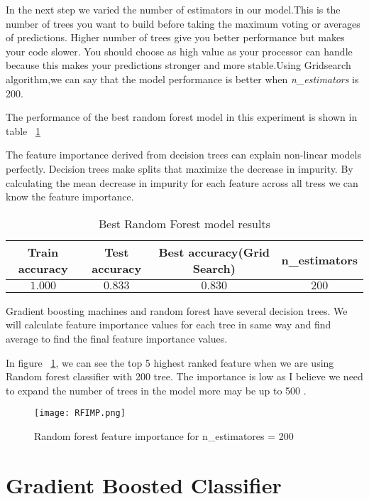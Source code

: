 \documentclass{article}
\begin{document}
In the next step we varied the number of estimators in our model.This is the number of trees you want to build before taking the maximum voting or averages of predictions. Higher number of trees give you better performance but makes your code slower. You should choose as high value as your processor can handle because this makes your predictions stronger and more stable.Using Gridsearch algorithm,we can say that the model performance is better when \textit{n\_estimators} is 200.

The performance of the best random forest model in this experiment is shown in table ~\ref{table:3}

The feature importance derived from decision trees can explain non-linear models perfectly. Decision trees make splits that maximize the decrease in impurity. By calculating the mean decrease in impurity for each feature  across all tress we can know the feature importance.


\begin{table}[H]
	\centering
	\begin{tabular}{|c| c| c| c|} 
		\hline
		Train accuracy & Test accuracy & Best accuracy(Grid Search)  & n\_estimators \\ 
		\hline\hline
		$1.000$ & $0.833$ & $0.830$ & $200$  \\ 
		\hline
	\end{tabular}
	\caption{{\small Best Random Forest model results}}
	\label{table:3}
\end{table} 
Gradient boosting machines and random forest have several decision trees. We will calculate feature importance values for each tree in same way and find average to find the final feature importance values.

In figure ~\ref{fig:RFIMP}, we can see the top 5 highest ranked feature when we are using Random forest classifier with 200 tree. The importance is low as I believe we need to expand the number of trees in the model more may be up to 500 .

\begin{figure}[H]
	\centering		
	\texttt{[image: RFIMP.png]}\caption{\footnotesize Random forest feature importance for n\_estimatores = 200}
	\label{fig:RFIMP}	
	
\end{figure} 
\section{Gradient Boosted  Classifier }
\end{document}
